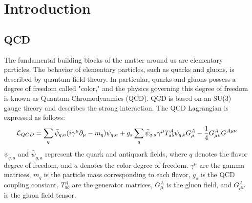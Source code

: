 \section{Introduction}
    \subsection{QCD}
    \label{Intro:QCD}
        The fundamental building blocks of the matter around us are elementary particles. The behavior of elementary particles, such as quarks and gluons, is described by quantum field theory. In particular, quarks and gluons possess a degree of freedom called "color," and the physics governing this degree of freedom is known as Quantum Chromodynamics (QCD). QCD is based on an SU(3) gauge theory and describes the strong interaction. The QCD Lagrangian is expressed as follows:
        \begin{eqnarray}
            \label{QCDlagrangian}
            \mathcal{L}_{QCD}=\sum_q \bar{\psi}_{q,a}\qty(i\gamma^\mu\partial_\mu-m_q)\psi_{q,a}+g_s \sum_q \bar{\psi}_{q,a}\gamma^\mu T^A_{ab}\psi_{q,b}G^A_\mu-\frac{1}{4}G^A_{\mu\nu}G^{A\mu\nu}
        \end{eqnarray}
        $\psi_{q,a}$ and $\bar{\psi}_{q,a}$ represent the quark and antiquark fields, where $q$ denotes the flavor degree of freedom, and $a$ denotes the color degree of freedom. $\gamma^\mu$ are the gamma matrices, $m_q$ is the particle mass corresponding to each flavor, $g_s$ is the QCD coupling constant, $T^A_{ab}$ are the generator matrices, $G^A_\mu$ is the gluon field, and $G^A_{\mu\nu}$ is the gluon field tensor.  

